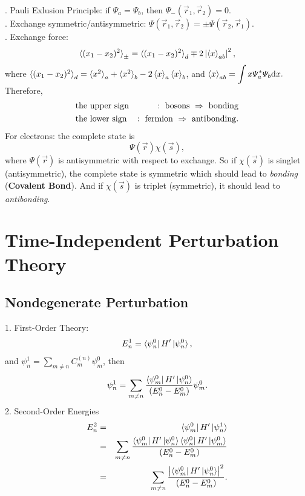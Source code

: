 \documentclass[12pt, 
]{article}
\begin{document}
. Pauli Exlusion Principle: if $\varPsi_a=\varPsi_b$, then $\varPsi_{-}(\vec{r}_1,\vec{r}_2)=0$.\\

. Exchange symmetric/antisymmetric: $\varPsi(\vec{r}_1,\vec{r}_2)=\pm\varPsi(\vec{r}_2,\vec{r}_1)$.\\

. Exchange force:
\[
	\braket{(x_1-x_2)^2}_\pm=\braket{(x_1-x_2)^2}_d\mp 2\left|\braket{x}_{ab}\right|^2,
\]
where $\braket{(x_1-x_2)^2}_d=\braket{x^2}_a+\braket{x^2}_b-2\braket{x}_a\braket{x}_b$, and $\displaystyle\braket{x}_{ab}=\int x\varPsi_a^*\varPsi_b{\rm d}x.$ Therefore, 
\begin{eqnarray*}
	 &\rm the~upper~sign&\rm :~bosons~\Rightarrow~bonding\\
	 &\rm the~lower~sign&\rm :~fermion~\Rightarrow~antibonding.
\end{eqnarray*}
For electrons: the complete state is
\[
	\varPsi(\vec{r})\chi(\vec{s}),
\]
where $\varPsi(\vec{r})$ is antisymmetric with respect to exchange. So if $\chi(\vec{s})$ is singlet (antisymmetric), the complete state is symmetric which should lead to {\it bonding} ({\bf Covalent Bond}). And if $\chi(\vec{s})$ is triplet (symmetric), it should lead to {\it antibonding}.
\newpage

\section{Time-Independent Perturbation Theory}
\subsection{Nondegenerate Perturbation}
1. First-Order Theory:
\begin{equation}\label{eq:24}
	E^1_n=\bra{\psi_n^0}H'\ket{\psi_n^0},
\end{equation}
and $\psi^1_n=\sum_{m\neq n}C_m^{(n)}\psi_m^0$, then
\[
	\psi^1_n=\sum_{m\neq n}\frac{\bra{\psi_m^0}H'\ket{\psi_n^0}}{(E_n^0-E_m^0)}\psi_m^0.
\]
2. Second-Order Energies
\begin{eqnarray*}
	E_n^2&=&\bra{\psi_m^0}H'\ket{\psi_n^1}\\
	&=&\sum_{m\neq n}\frac{\bra{\psi_m^0}H'\ket{\psi_n^0}\bra{\psi_n^0}H'\ket{\psi_m^0}}{(E_n^0-E_m^0)}\\
	&=&\sum_{m\neq n}\frac{\left|\bra{\psi_m^0}H'\ket{\psi_n^0}\right|^2}{(E_n^0-E_m^0)}.
\end{eqnarray*}
\end{document}
